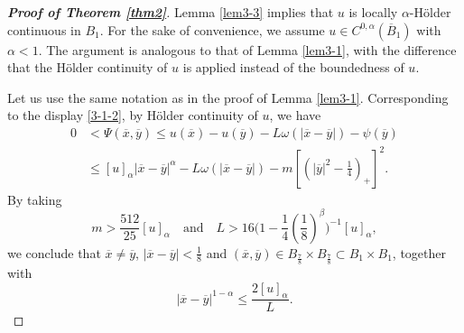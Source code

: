 \documentclass[11pt,reqno]{amsart}
\numberwithin{equation}{section}
\begin{document}
\begin{proof}[\textbf{Proof of Theorem \ref{thm2}}]
Lemma \ref{lem3-3} implies that $u$ is locally $\alpha$-H\"{o}lder continuous in $B_1$.
 For the sake of convenience, we assume $u\in C^{0,\alpha}(\overline{B}_1)$ with $\alpha<1$.
The argument is analogous to that of Lemma \ref{lem3-1}, with the difference that the H\"{o}lder continuity of $u$ is applied instead of the boundedness of $u$.

Let us use the same notation as  in the proof of Lemma \ref{lem3-1}. Corresponding to the display \eqref{3-1-2}, by H\"{o}lder continuity of $u$, we have
\begin{align*}
0&<\Psi(\overline{x},\overline{y})\le u(\overline{x})-u(\overline{y})-L\omega(|\overline{x}-\overline{y}|)-\psi(\overline{y}) \nonumber\\
&\le[u]_\alpha|\overline{x}-\overline{y}|^\alpha-L\omega(|\overline{x}-\overline{y}|)-m\left[\left(|\overline{y}|^2-\frac{1}{4}\right)_+\right]^2.
\end{align*}
By taking
$$
m>\frac{512}{25}[u]_\alpha
\quad\text{and}\quad
L>16\biggl(1-\frac{1}{4}\left(\frac{1}{8}\right)^\beta\biggr)^{-1}[u]_\alpha,
$$
we conclude that $\overline{x}\neq\overline{y}$, $|\overline{x}-\overline{y}|<\frac{1}{8}$ and $(\overline{x},\overline{y})\in B_\frac{7}{8}\times B_\frac{7}{8}\subset B_1\times B_1$, together with
\begin{equation}
\label{3-4-1}
|\overline{x}-\overline{y}|^{1-\alpha}\le\frac{2[u]_\alpha}{L}.
\end{equation}


\end{proof}
\end{document}
